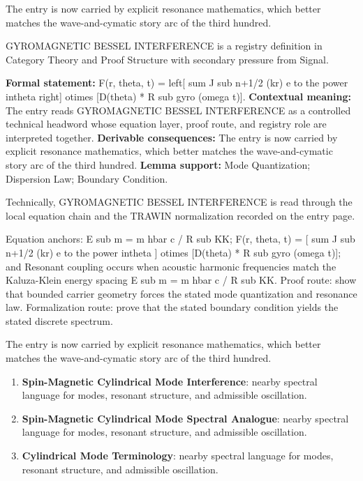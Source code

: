 The entry is now carried by explicit resonance mathematics, which better matches the wave-and-cymatic story arc of the third hundred.
\clearpage


\begingroup\small
{}
GYROMAGNETIC BESSEL INTERFERENCE is a registry definition in Category Theory and Proof Structure with secondary pressure from Signal.

\begingroup\footnotesize\setlength{\emergencystretch}{3em}\sloppy
\textbf{Formal statement:} F(r, theta, t) = left[ sum J sub n+1/2 (kr) e to the power intheta right] otimes [D(theta) * R sub gyro (omega t)]. \textbf{Contextual meaning:} The entry reads GYROMAGNETIC BESSEL INTERFERENCE as a controlled technical headword whose equation layer, proof route, and registry role are interpreted together. \textbf{Derivable consequences:} The entry is now carried by explicit resonance mathematics, which better matches the wave-and-cymatic story arc of the third hundred. \textbf{Lemma support:} Mode Quantization; Dispersion Law; Boundary Condition.\par
\endgroup

Technically, GYROMAGNETIC BESSEL INTERFERENCE is read through the local equation chain and the TRAWIN normalization recorded on the entry page.

Equation anchors: E sub m = m hbar c / R sub KK; F(r, theta, t) = [ sum J sub n+1/2 (kr) e to the power intheta ] otimes [D(theta) * R sub gyro (omega t)]; and Resonant coupling occurs when acoustic harmonic frequencies match the Kaluza-Klein energy spacing E sub m = m hbar c / R sub KK. Proof route: show that bounded carrier geometry forces the stated mode quantization and resonance law. Formalization route: prove that the stated boundary condition yields the stated discrete spectrum.

The entry is now carried by explicit resonance mathematics, which better matches the wave-and-cymatic story arc of the third hundred.
\endgroup

\begin{enumerate}[leftmargin=1.6em,itemsep=6pt,topsep=4pt]
\item \textbf{Spin-Magnetic Cylindrical Mode Interference}: nearby spectral language for modes, resonant structure, and admissible oscillation.
\item \textbf{Spin-Magnetic Cylindrical Mode Spectral Analogue}: nearby spectral language for modes, resonant structure, and admissible oscillation.
\item \textbf{Cylindrical Mode Terminology}: nearby spectral language for modes, resonant structure, and admissible oscillation.
\end{enumerate}


